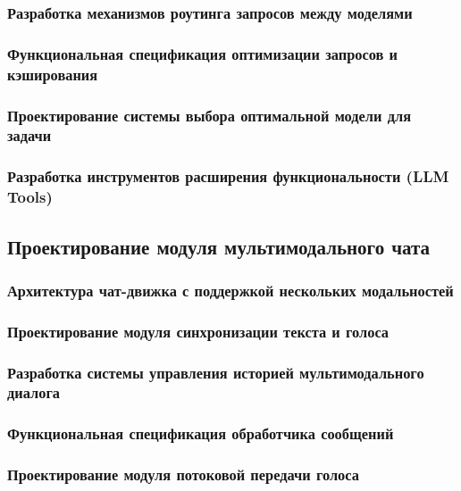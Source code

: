 \documentclass{syksu-coursework}
\begin{document}
\subsubsection{Разработка механизмов роутинга запросов между моделями}

\subsubsection{Функциональная спецификация оптимизации запросов и кэширования}

\subsubsection{Проектирование системы выбора оптимальной модели для задачи}

\subsubsection{Разработка инструментов расширения функциональности (LLM Tools)}

\subsection{Проектирование модуля мультимодального чата}

\subsubsection{Архитектура чат-движка с поддержкой нескольких модальностей}

\subsubsection{Проектирование модуля синхронизации текста и голоса}

\subsubsection{Разработка системы управления историей мультимодального диалога}

\subsubsection{Функциональная спецификация обработчика сообщений}

\subsubsection{Проектирование модуля потоковой передачи голоса}
\end{document}
